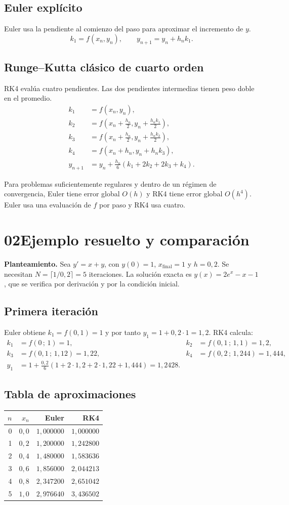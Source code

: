 \documentclass[11pt,a4paper]{article}
\newcommand{\topic}[2]{\section*{\sffamily\color{Navy}#1\enspace #2}\vspace{-.35em}}
\newcommand{\subtopic}[1]{\subsection*{\sffamily\color{Blue}#1}}
\newcommand{\callout}[1]{\noindent\colorbox{Pale}{\parbox{\dimexpr\linewidth-2\fboxsep\relax}{\vspace{.45em}\hspace{.5em}\begin{minipage}{\dimexpr\linewidth-1em\relax}#1\end{minipage}\vspace{.45em}}}}
\begin{document}
\subtopic{Euler explícito}
Euler usa la pendiente al comienzo del paso para aproximar el incremento de $y$.
\[
 k_1=f(x_n,y_n),\qquad y_{n+1}=y_n+h_n k_1.
\]

\subtopic{Runge--Kutta clásico de cuarto orden}
RK4 evalúa cuatro pendientes. Las dos pendientes intermedias tienen peso doble en el promedio.
\begin{align*}
 k_1 &= f(x_n,y_n),\\
 k_2 &= f\!\left(x_n+\tfrac{h_n}{2},y_n+\tfrac{h_nk_1}{2}\right),\\
 k_3 &= f\!\left(x_n+\tfrac{h_n}{2},y_n+\tfrac{h_nk_2}{2}\right),\\
 k_4 &= f(x_n+h_n,y_n+h_nk_3),\\
 y_{n+1} &= y_n+\frac{h_n}{6}(k_1+2k_2+2k_3+k_4).
\end{align*}
\callout{Para problemas suficientemente regulares y dentro de un régimen de convergencia, Euler tiene error global $O(h)$ y RK4 tiene error global $O(h^4)$. Euler usa una evaluación de $f$ por paso y RK4 usa cuatro.}

\newpage
\topic{02}{Ejemplo resuelto y comparación}
\textbf{Planteamiento.} Sea $y'=x+y$, con $y(0)=1$, $x_{\mathrm{final}}=1$ y $h=0{,}2$. Se necesitan $N=\lceil 1/0{,}2\rceil=5$ iteraciones. La solución exacta es $y(x)=2e^x-x-1$, que se verifica por derivación y por la condición inicial.

\subtopic{Primera iteración}
Euler obtiene $k_1=f(0,1)=1$ y por tanto $y_1=1+0{,}2\cdot1=1{,}2$. RK4 calcula:
\begin{align*}
 k_1 &= f(0\,;\,1)=1, & k_2 &= f(0{,}1\,;\,1{,}1)=1{,}2,\\
 k_3 &= f(0{,}1\,;\,1{,}12)=1{,}22, & k_4 &= f(0{,}2\,;\,1{,}244)=1{,}444,\\[.4em]
 y_1 &=1+\frac{0{,}2}{6}(1+2\cdot1{,}2+2\cdot1{,}22+1{,}444)=1{,}2428.&&
\end{align*}

\subtopic{Tabla de aproximaciones}
\begin{center}
\begin{tabular}{@{}rrrr@{}}
\toprule
 $n$ & $x_n$ & Euler & RK4 \\
\midrule
 0 & $0{,}0$ & $1{,}000000$ & $1{,}000000$ \\
 1 & $0{,}2$ & $1{,}200000$ & $1{,}242800$ \\
 2 & $0{,}4$ & $1{,}480000$ & $1{,}583636$ \\
 3 & $0{,}6$ & $1{,}856000$ & $2{,}044213$ \\
 4 & $0{,}8$ & $2{,}347200$ & $2{,}651042$ \\
 5 & $1{,}0$ & $2{,}976640$ & $3{,}436502$ \\
\bottomrule
\end{tabular}
\end{center}
\end{document}
